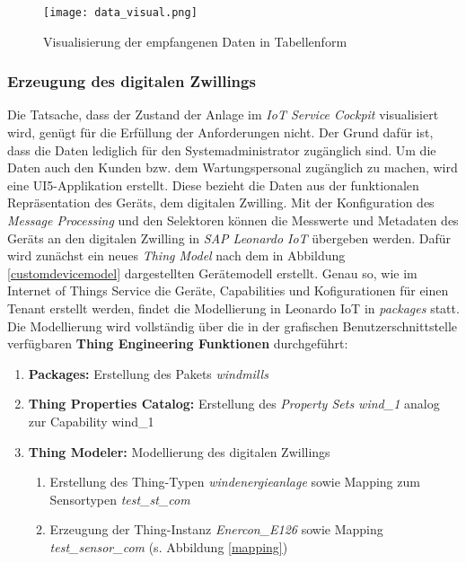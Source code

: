 \begin{figure}[H]
  \texttt{[image: data\_visual.png]}
  \caption{Visualisierung der empfangenen Daten in Tabellenform}
  \label{datavisual}
\end{figure}


\subsubsection{Erzeugung des digitalen Zwillings}

Die Tatsache, dass der Zustand der Anlage im \textit{IoT Service Cockpit} visualisiert wird, genügt für die Erfüllung der Anforderungen nicht. Der Grund dafür ist, dass die Daten lediglich für den Systemadministrator zugänglich sind. Um die Daten auch den Kunden bzw. dem Wartungspersonal zugänglich zu machen, wird eine UI5-Applikation erstellt. Diese bezieht die Daten aus der funktionalen Repräsentation des Geräts, dem digitalen Zwilling. Mit der Konfiguration des \textit{Message Processing} und den Selektoren können die Messwerte und Metadaten des Geräts an den digitalen Zwilling in \textit{SAP Leonardo IoT} übergeben werden. Dafür wird zunächst ein neues \textit{Thing Model} nach dem in Abbildung \ref{customdevicemodel} dargestellten Gerätemodell erstellt. Genau so, wie im Internet of Things Service die Geräte, Capabilities und Kofigurationen für einen Tenant erstellt werden, findet die Modellierung in Leonardo IoT in \textit{packages} statt. Die Modellierung wird vollständig über die in der grafischen Benutzerschnittstelle verfügbaren \textbf{Thing Engineering Funktionen} durchgeführt:
\begin{enumerate}
  \item \textbf{Packages:} Erstellung des Pakets \textit{windmills}
  \item \textbf{Thing Properties Catalog:} Erstellung des \textit{Property Sets wind\_1} analog zur Capability wind\_1
  \item \textbf{Thing Modeler:} Modellierung des digitalen Zwillings
  \begin{enumerate}
    \item Erstellung des Thing-Typen \textit{windenergieanlage} sowie Mapping zum Sensortypen \textit{test\_st\_com}
    \item Erzeugung der Thing-Instanz \textit{Enercon\_E126} sowie Mapping \textit{test\_sensor\_com} (s. Abbildung \ref{mapping})
  \end{enumerate}
\end{enumerate}


